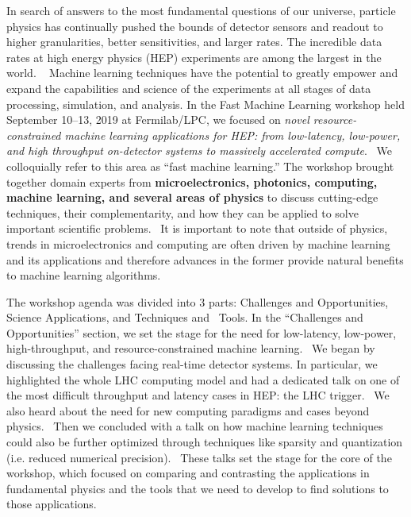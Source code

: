 \documentclass[11pt,letterpaper,fleqn]{article}
\begin{document}
In search of answers to the most fundamental questions of our universe, particle physics has continually pushed the bounds of detector sensors and readout to higher granularities, better sensitivities, and larger rates. The incredible data rates at high energy physics (HEP) experiments are among the largest in the world.  
Machine learning techniques have the potential to greatly empower and expand the capabilities and science of the experiments at all stages of data processing, simulation, and analysis.
In the Fast Machine Learning workshop held September 10--13, 2019 at Fermilab/LPC, we focused on  {\it novel resource-constrained machine learning applications for HEP: from low-latency, low-power, and high throughput on-detector systems to massively accelerated compute}.  We colloquially refer to this area as ``fast machine learning.'' The workshop brought together domain experts from {\bf microelectronics, photonics, computing, machine learning, and several areas of physics} to discuss cutting-edge techniques, their complementarity, and how they can be applied to solve important scientific problems.  It is important to note that outside of physics, trends in microelectronics and computing are often driven by machine learning and its applications and therefore advances in the former provide natural benefits to machine learning algorithms.

The workshop agenda was divided into 3 parts: Challenges and Opportunities, Science Applications, and Techniques and  Tools.
In the ``Challenges and Opportunities'' section, we set the stage for the need for low-latency, low-power, high-throughput, and resource-constrained machine learning.  We began by discussing the challenges facing real-time detector systems. In particular, we highlighted the whole LHC computing model and had a dedicated talk on one of the most difficult throughput and latency cases in HEP: the LHC trigger.  We also heard about the need for new computing paradigms and cases beyond physics.  Then we concluded with a talk on how machine learning techniques could also be further optimized through techniques like sparsity and quantization (i.e. reduced numerical precision).  These talks set the stage for the core of the workshop, which focused on comparing and contrasting the applications in fundamental physics and the tools that we need to develop to find solutions to those applications.  
\end{document}

